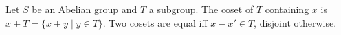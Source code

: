 Let $S$ be an Abelian group and $T$ a subgroup. The coset of $T$ containing $x$ is $x + T = \{x + y \mid y \in T\}$. Two cosets are equal iff $x - x' \in T$, disjoint otherwise.
